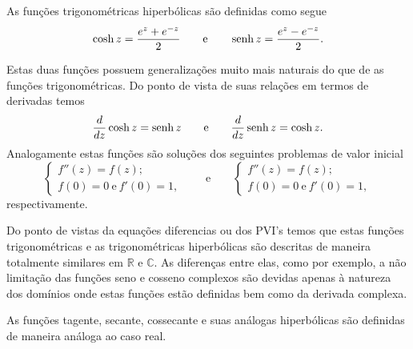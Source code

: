 As funções trigonométricas hiperbólicas são definidas como segue
\[
\cosh z= \frac{e^z+e^{-z}}{2}
\qquad\text{e}\qquad
\operatorname{senh} z = \frac{e^{z}-e^{-z}}{2}.
\]

Estas duas funções possuem generalizações muito mais naturais do que de
as funções trigonométricas. Do ponto de vista de suas relações em termos 
de derivadas temos 
\[
\frac{d}{dz}\cosh z = \operatorname{senh} z 
\qquad \text{e}\qquad 
\frac{d}{dz}\operatorname{senh} z = \cosh z.
\]
Analogamente estas funções são soluções dos seguintes problemas de valor
inicial 
\[
\begin{cases}
f''(z)=f(z);
\\[0.2cm]
f(0)=0 \ \text{e}\ f'(0)=1,
\end{cases}
\qquad \text{e}\qquad 
\begin{cases}
f''(z)=f(z);
\\[0.2cm]
f(0)=0 \ \text{e}\ f'(0)=1,
\end{cases}
\]
respectivamente.

Do ponto de vistas da equações diferencias ou dos PVI's temos que
estas funções trigonométricas e as trigonométricas hiperbólicas 
são descritas de maneira totalmente similares em $\mathbb{R}$ e $\mathbb{C}$.
As diferenças entre elas, como por exemplo, a não limitação das funções seno e
cosseno complexos são devidas apenas à natureza dos domínios 
onde estas funções estão definidas bem como da derivada complexa.

As funções tagente, secante, cossecante e suas análogas hiperbólicas são
definidas de maneira análoga ao caso real.  



